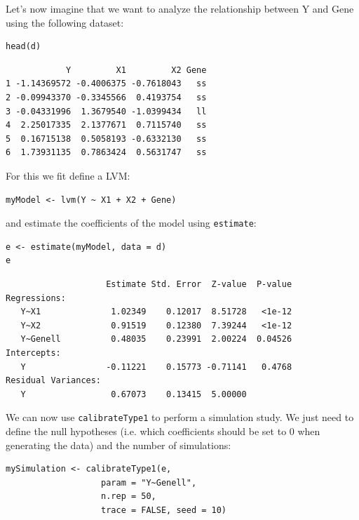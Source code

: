 \documentclass[12pt]{article}
\begin{document}
Let's now imagine that we want to analyze the relationship between
Y and Gene using the following dataset:
\lstset{language=r,label= ,caption= ,captionpos=b,numbers=none}
\begin{lstlisting}
head(d)
\end{lstlisting}

\begin{verbatim}
            Y         X1         X2 Gene
1 -1.14369572 -0.4006375 -0.7618043   ss
2 -0.09943370 -0.3345566  0.4193754   ss
3 -0.04331996  1.3679540 -1.0399434   ll
4  2.25017335  2.1377671  0.7115740   ss
5  0.16715138  0.5058193 -0.6332130   ss
6  1.73931135  0.7863424  0.5631747   ss
\end{verbatim}


For this we fit define a LVM:
\lstset{language=r,label= ,caption= ,captionpos=b,numbers=none}
\begin{lstlisting}
myModel <- lvm(Y ~ X1 + X2 + Gene)
\end{lstlisting}

and estimate the coefficients of the model using \texttt{estimate}:
\lstset{language=r,label= ,caption= ,captionpos=b,numbers=none}
\begin{lstlisting}
e <- estimate(myModel, data = d)
e
\end{lstlisting}

\begin{verbatim}
                    Estimate Std. Error  Z-value  P-value
Regressions:                                             
   Y~X1              1.02349    0.12017  8.51728   <1e-12
   Y~X2              0.91519    0.12380  7.39244   <1e-12
   Y~Genell          0.48035    0.23991  2.00224  0.04526
Intercepts:                                              
   Y                -0.11221    0.15773 -0.71141   0.4768
Residual Variances:                                      
   Y                 0.67073    0.13415  5.00000
\end{verbatim}


We can now use \texttt{calibrateType1} to perform a simulation study. We just
need to define the null hypotheses (i.e. which coefficients should be
set to 0 when generating the data) and the number of simulations:
\lstset{language=r,label= ,caption= ,captionpos=b,numbers=none}
\begin{lstlisting}
mySimulation <- calibrateType1(e, 
			       param = "Y~Genell",
			       n.rep = 50, 
			       trace = FALSE, seed = 10)
\end{lstlisting}
\end{document}
